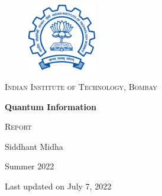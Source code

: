 \documentclass{article}
\title{}
\author{Siddhant Midha}
\date{}
\newcommand{\updateinfo}[1][\today]{\par\vfill\hfill{\scriptsize\color{gray}Last updated on July 7, 2022}}
\theoremstyle{definition}
\begin{document}
\begin{titlepage}
    \centering
    \begin{figure}[htp]
        \centering
        \includegraphics[width=3cm]{logo}
         \label{fig:galaxy}
    \end{figure}
    {\scshape\LARGE Indian Institute of Technology, Bombay \par}
    \vspace{1cm}
    \vspace{1.2cm}
    {\huge\bfseries Quantum Information\par}
        \vspace{0.3cm}

    {\scshape Report\par}
    \vspace{2cm}
    {\Large Siddhant Midha\par}
    \vfill
   

    {\large Summer 2022}
\updateinfo 
\end{titlepage}
\tableofcontents\newpage 
{}




%
\newpage 
\end{document}
